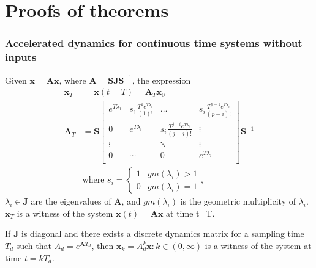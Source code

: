 \documentclass[sigconf]{llncs}
\newcommand{\mat}[1]{\boldsymbol{#1}}
\renewcommand{\vec}[1]{\boldsymbol{#1}}
\begin{document}
\section{Proofs of theorems}
\setcounter{theorem}{0}
\setcounter{corollary}{0}
 \subsubsection{Accelerated dynamics for continuous time systems without inputs}\label{asec:real_discrete_no_inputs}
 \begin{theorem}
 Given $\dot{\vec{x}}=\mat{A}\vec{x}$, where $\mat{A}=\mat{S}\mat{J}\mat{S}^{-1}$, the expression
 \begin{align}
 \vec{x}_T&=\vec{x}(t=T)=\mat{A}_{T}\vec{x}_0\\
 \mat{A}_{T}&= \mat{S}
 \left [ \begin{array}{cccc}
 e^{T\lambda_1}  & s_1\frac{T^{1}e^{T\lambda_i}}{(1)!} & \hdots  & s_i\frac{T^{p-1}e^{T\lambda_i}}{(p-i)!} \\
0 & e^{T\lambda_i}  & s_i\frac{T^{j-i}e^{T\lambda_i}}{(j-i)!} & \vdots \\
\vdots & & \ddots & \vdots \\
0 & \cdots & 0  &e^{T\lambda_i} \\
\end{array} \right ]
 \mat{S}^{-1}
 \label{appendix:continuous_tube_dyn}\\
 &\text{where } s_i=\left\{\begin{array}{cc}1&gm(\lambda_i)>1\\0&gm(\lambda_i)=1\end{array}\right.,\nonumber
 \end{align}
$\lambda_i \in \mat{J}$ are the eigenvalues of $\mat{A}$, and $gm(\lambda_i)$ is the geometric multiplicity of $\lambda_i$.  $\vec{x}_T$ is a witness of the system $\dot{\vec{x}}(t)=\mat{A}\vec{x}$ at time t=T.
 \end{theorem}
 \begin{corollary}
 If $\mat{J}$ is diagonal and there exists a discrete dynamics matrix for a sampling time $T_d$ such that $A_d=e^{\mat{A} T_d}$, then $\vec{x}_k=A_d^k\vec{x} : k \in (0,\infty)$ is a witness of the system at time $t=kT_d$.
 \end{corollary}
\end{document}
